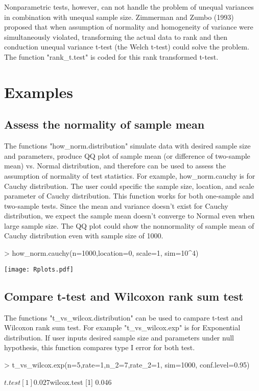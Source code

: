 \documentclass[11pt]{article}
\begin{document}
Nonparametric tests, however, can not handle the problem of unequal variances in combination with unequal sample size. Zimmerman and Zumbo (1993) proposed that when assumption of normality and homogeneity of variance were simultaneously violated, transforming the actual data to rank and then conduction unequal variance t-test (the Welch t-test) could solve the problem. The function "rank\_t.test" is coded for this rank transformed t-test. 


\section{Examples}

\subsection{Assess the normality of sample mean}
The functions "how\_norm.distribution" simulate data with desired sample size and parameters, produce QQ plot of sample mean (or difference of two-sample mean) vs. Normal distribution, and therefore can be used to assess the assumption of normality of test statistics. For example, how\_norm.cauchy is for Cauchy distribution. The user could specific the sample size, location, and scale parameter of Cauchy distribution. This function works for both one-sample and two-sample tests. Since the mean and variance doesn't exist for Cauchy distribution, we expect the sample mean doesn't converge to Normal even when large sample size. The QQ plot could show the nonnormality of sample mean of Cauchy distribution even with sample size of 1000. 
\begin{Schunk}
\begin{Sinput}
> how_norm.cauchy(n=1000,location=0, scale=1, sim=10^4)
\end{Sinput}
\end{Schunk}
\texttt{[image: Rplots.pdf]}

\subsection{Compare t-test and Wilcoxon rank sum test}
The functions "t\_vs\_wilcox.distribution" can be used to campare t-test and Wilcoxon rank sum test. For example "t\_vs\_wilcox.exp" is for Exponential distribution. If user inputs desired sample size and parameters under null hypothesis, this function compares type I error for both test. 
\begin{Schunk}
\begin{Sinput}
> t_vs_wilcox.exp(n=5,rate=1,n_2=7,rate_2=1, sim=1000, conf.level=0.95)
\end{Sinput}
\begin{Soutput}
$t.test
[1] 0.027

$wilcox.test
[1] 0.046
\end{Soutput}
\end{Schunk}
\end{document}
